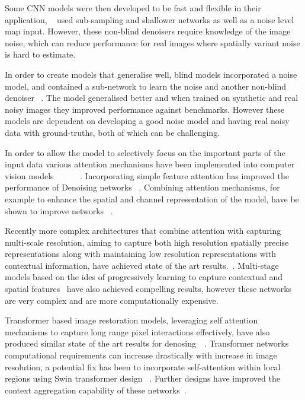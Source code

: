 \documentclass[project-plan]{report-template}
\begin{document}
Some CNN models were then developed to be fast and flexible in their application, ~\cite{zhang2018ffdnet} used sub-sampling and shallower networks as well as a noise level map input. However, these non-blind denoisers require knowledge of the image noise, which can reduce performance for real images where spatially variant noise is hard to estimate.  

In order to create models that generalise well, blind models incorporated a noise model, and contained a sub-network to learn the noise and another non-blind denoiser ~\cite{Guo2019Cbdnet}. The model generalised better and when trained on synthetic and real noisy images they improved performance against benchmarks. However these models are dependent on developing a good noise model and having real noisy data with ground-truths, both of which can be challenging.

In order to allow the model to selectively focus on the important parts of the input data various attention mechanisms have been implemented into computer vision models ~\cite{wang2017residual} ~\cite{hu2018senet}~\cite{woo2018cbam}~\cite{wang2020eca}~\cite{hou2021coordinate}. Incorporating simple feature attention has improved the performance of Denoising networks ~\cite{anwar2019real}. Combining attention mechanisms, for example to enhance the spatial and channel representation of the model, have be shown to improve networks ~\cite{cai2023cbamdncnn}.

Recently more complex architectures that combine attention with capturing multi-scale resolution, aiming to capture both high resolution spatially precise representations along with maintaining low resolution representations with contextual information, have achieved state of the art results.~\cite{zamir2020MIRNet}. Multi-stage models based on the ides of progressively learning to capture contextual and spatial features~\cite{zamir2021MPRNet} have also achieved compelling results, however these networks are very complex and are more computationally expensive.

Transformer based image restoration models, leveraging self attention mechanisms to capture long range pixel interactions effectively, have also produced similar state of the art results for denosing~\cite{zamir2021restormer}~\cite{wang2022uformer}. Transformer networks computational requirements can increase drastically with increase in image resolution, a potential fix has been to incorporate  self-attention within local regions using Swin transformer design ~\cite{wang2022uformer}. Further designs have improved the context aggregation capability of these networks~\cite{zamir2021restormer}.
\end{document}
